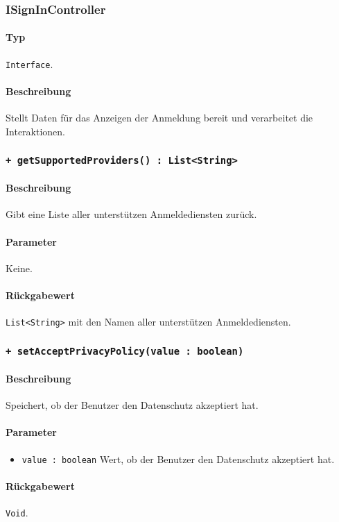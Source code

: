 \subsubsection{ISignInController}
\paragraph*{Typ}
\texttt{Interface}.
\paragraph*{Beschreibung}
Stellt Daten für das Anzeigen der Anmeldung bereit und verarbeitet die Interaktionen.

\subsubsection{\texttt{+ getSupportedProviders() : List<String>}}%
\paragraph*{Beschreibung}
Gibt eine Liste aller unterstützen Anmeldediensten zurück.
\paragraph*{Parameter}
Keine.
\paragraph*{Rückgabewert}
\texttt{List<String>} mit den Namen aller unterstützen Anmeldediensten.

\subsubsection{\texttt{+ setAcceptPrivacyPolicy(value : boolean)}}%
\paragraph*{Beschreibung}
Speichert, ob der Benutzer den Datenschutz akzeptiert hat.
\paragraph*{Parameter}
\begin{itemize}
    \item \texttt{value : boolean} Wert, ob der Benutzer den Datenschutz akzeptiert hat.
\end{itemize}
\paragraph*{Rückgabewert}
\texttt{Void}.

